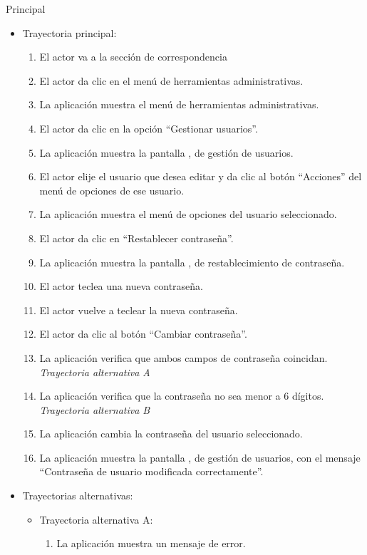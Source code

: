 \begin{UCtrayectoria}{Principal}
			\begin{itemize}
				\item Trayectoria principal:
					\begin{enumerate}
						\item El actor va a la sección de correspondencia 
						\item El actor da clic en el menú de herramientas administrativas.
						\item La aplicación muestra el menú de herramientas administrativas.
						\item El actor da clic en la opción ``Gestionar usuarios''.
						\item La aplicación muestra la pantalla , de gestión de usuarios.
						\item El actor elije el usuario que desea editar y da clic al botón ``Acciones'' del menú de opciones de ese usuario.
						\item La aplicación muestra el menú de opciones del usuario seleccionado.
						\item El actor da clic en ``Restablecer contraseña''.
						\item La aplicación muestra la pantalla , de restablecimiento de contraseña.
						\item El actor teclea una nueva contraseña.
						\item El actor vuelve a teclear la nueva contraseña.
						\item El actor da clic al botón ``Cambiar contraseña''.
						\item La aplicación verifica que ambos campos de contraseña coincidan. \textsl{Trayectoria alternativa A}
						\item La aplicación verifica que la contraseña no sea menor a 6 dígitos. \textsl{Trayectoria alternativa B}
						\item La aplicación cambia la contraseña del usuario seleccionado.
						\item La aplicación muestra la pantalla , de gestión de usuarios, con el mensaje ``Contraseña de usuario modificada correctamente''.

					\end{enumerate}
				\item Trayectorias alternativas:
					\begin{itemize}
						\item Trayectoria alternativa A:
							\begin{enumerate}
								\item La aplicación muestra un mensaje de error.
							\end{enumerate}
					\end{itemize}
			\end{itemize}
			

\end{UCtrayectoria}
